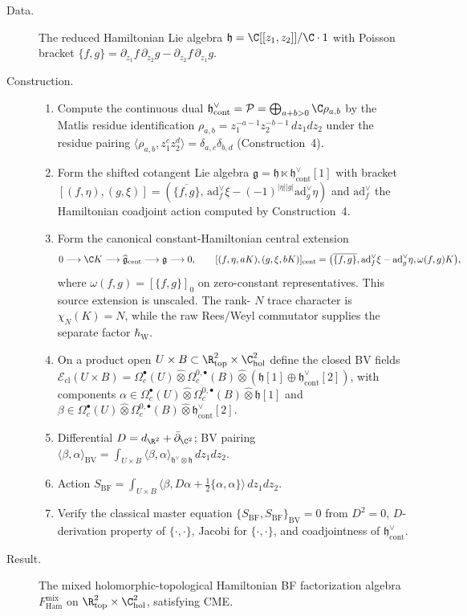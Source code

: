 \begin{description}
\item[Data.]  The reduced Hamiltonian Lie algebra
\(\mathfrak h=\C[[z_1,z_2]]/\C\cdot 1\) with Poisson bracket
\(\{f,g\}=\partial_{z_1}f\,\partial_{z_2}g-\partial_{z_2}f\,\partial_{z_1}g\).
\item[Construction.]
\begin{enumerate}
\item Compute the continuous dual
\(\mathfrak h^\vee_{\mathrm{cont}}=\mathcal P=\bigoplus_{a+b>0}\C\rho_{a,b}\)
by the Matlis residue identification
\(\rho_{a,b}=z_1^{-a-1}z_2^{-b-1}\,dz_1dz_2\) under the residue
pairing \(\langle\rho_{a,b},z_1^cz_2^d\rangle=\delta_{a,c}\delta_{b,d}\)
(Construction~4).
\item Form the shifted cotangent Lie algebra
\(\mathfrak g=\mathfrak h\ltimes\mathfrak h^\vee_{\mathrm{cont}}[1]\)
with bracket
\([(f,\eta),(g,\xi)]
=(\overline{\{f,g\}},\,\mathrm{ad}^\vee_f\xi
-(-1)^{|\eta||g|}\mathrm{ad}^\vee_g\eta)\)
and \(\mathrm{ad}^\vee_f\) the Hamiltonian coadjoint action computed
by Construction~4.
\item Form the canonical constant-Hamiltonian central extension
\[
  0\longrightarrow\C K\longrightarrow
  \widehat{\mathfrak g}_{\mathrm{cent}}
  \longrightarrow\mathfrak g\longrightarrow0,
  \qquad
  [(f,\eta,aK),(g,\xi,bK)]_{\mathrm{cent}}
  =\bigl(\overline{\{f,g\}},
  \mathrm{ad}^\vee_f\xi-\mathrm{ad}^\vee_g\eta,
  \omega(f,g)K\bigr),
\]
where \(\omega(f,g)=[\{f,g\}]_0\) on zero-constant
representatives.  This source extension is unscaled.  The rank-
\(N\) trace character is \(\chi_N(K)=N\), while the raw Rees/Weyl
commutator supplies the separate factor \(\hbar_{\mathrm W}\).
\item On a product open
\(U\times B\subset\R^2_{\mathrm{top}}\times\C^2_{\mathrm{hol}}\)
define the closed BV fields
\(\mathcal E_{\mathrm{cl}}(U\times B)
=\Omega^\bullet_c(U)\widehat\otimes\Omega^{0,\bullet}_c(B)
\widehat\otimes(\mathfrak h[1]\oplus\mathfrak h^\vee_{\mathrm{cont}}[2])\),
with components
\(\alpha\in\Omega^\bullet_c(U)\widehat\otimes\Omega^{0,\bullet}_c(B)
\widehat\otimes\mathfrak h[1]\) and
\(\beta\in\Omega^\bullet_c(U)\widehat\otimes\Omega^{0,\bullet}_c(B)
\widehat\otimes\mathfrak h^\vee_{\mathrm{cont}}[2]\).
\item Differential \(D=d_{\R^2}+\bar\partial_{\C^2}\); BV pairing
\(\langle\beta,\alpha\rangle_{\mathrm{BV}}
=\int_{U\times B}\langle\beta,\alpha\rangle_{\mathfrak h^\vee\otimes\mathfrak h}\,dz_1dz_2\).
\item Action
\(S_{\mathrm{BF}}=\int_{U\times B}
\langle\beta,D\alpha+\tfrac12\{\alpha,\alpha\}\rangle\,dz_1dz_2\).
\item Verify the classical master equation
\(\{S_{\mathrm{BF}},S_{\mathrm{BF}}\}_{\mathrm{BV}}=0\) from \(D^2=0\),
\(D\)-derivation property of \(\{\cdot,\cdot\}\), Jacobi for
\(\{\cdot,\cdot\}\), and coadjointness of \(\mathfrak h^\vee_{\mathrm{cont}}\).
\end{enumerate}
\item[Result.]  The mixed holomorphic-topological Hamiltonian BF
factorization algebra \(F^{\mathrm{mix}}_{\mathrm{Ham}}\) on
\(\R^2_{\mathrm{top}}\times\C^2_{\mathrm{hol}}\), satisfying CME.
\end{description}
